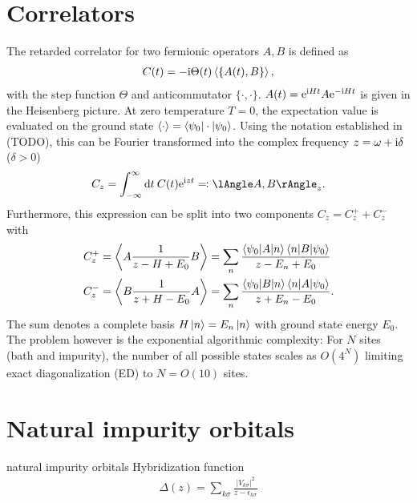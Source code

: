 \section{Correlators}

The retarded correlator for two fermionic operators $A, B$ is defined as
\begin{align}
    C(t) = -\mathrm{i} \Theta(t) \braket{\{A(t), B\}},
\end{align}
with the step function $\Theta$ and anticommutator $\{\cdot,\cdot\}$.
$A(t) = \mathrm{e}^{\mathrm{i} H t} A \mathrm{e}^{-\mathrm{i} H t}$ is given in the Heisenberg picture.
At zero temperature $T=0$, the expectation value is evaluated on the ground state
$\braket{\cdot} = \braket{\psi_0 | \cdot | \psi_0}$.
Using the notation established in (TODO),
this can be Fourier transformed into the complex frequency $z = \omega + \mathrm{i} \delta$ ($\delta > 0$)
\begin{align}
    C_z = \int_{-\infty}^\infty \md t\>C(t) \me^{\mi zt} \eqqcolon \lAngle A, B \rAngle_z.
\end{align}
Furthermore, this expression can be split into two components $C_z = C^+_z + C^-_z$ with
\begin{subequations}
    \begin{align}
        C^+_z
         & =
        \Braket{A \frac{1}{z - H + E_0} B}
        =
        \sum_n \frac{\braket{\psi_0 | A | n}\braket{n | B | \psi_0}}{z - E_n + E_0}
        \\
        C^-_z
         & =
        \Braket{B \frac{1}{z + H - E_0} A}
        =
        \sum_n \frac{\braket{\psi_0 | B | n}\braket{n | A | \psi_0}}{z + E_n - E_0}.
    \end{align}
\end{subequations}
The sum denotes a complete basis $H\ket{n} = E_n\ket{n}$ with ground state energy $E_0$.
The problem however is the exponential algorithmic complexity:
For $N$ sites (bath and impurity), the number of all possible states scales as $O(4^N)$
limiting exact diagonalization (ED) to $N=O(10)$ sites.

\section{Natural impurity orbitals}

natural impurity orbitals
Hybridization function
\begin{align}
    \Delta(z) = \sum_{k\sigma} \frac{|V_{k\sigma}|^2}{z - \epsilon_{k\sigma}}
\end{align}

